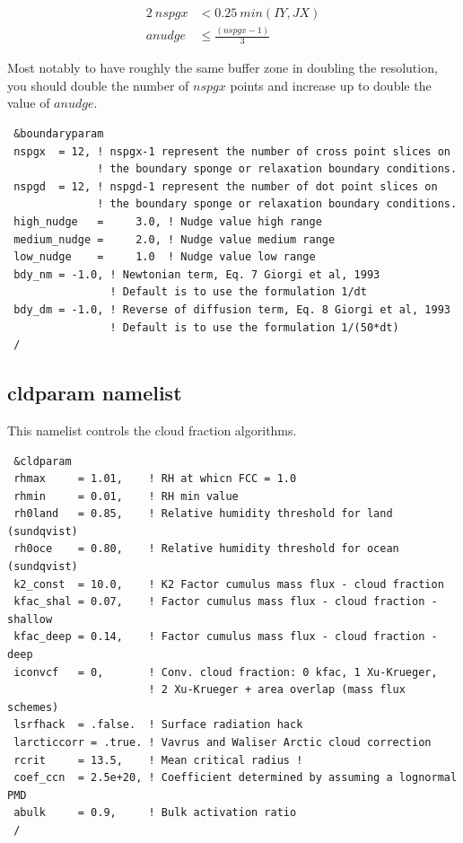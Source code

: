 \begin{align}
	2\ nspgx &< 0.25\ min(IY,JX) \\
	anudge &\le \frac{(nspgx-1)}{3}
\end{align}

Most notably to have roughly the same buffer zone in doubling the resolution,
you should double the number of $nspgx$ points and increase up to double the
value of $anudge$.

{\footnotesize
\begin{Verbatim}
 &boundaryparam
 nspgx  = 12, ! nspgx-1 represent the number of cross point slices on
              ! the boundary sponge or relaxation boundary conditions.
 nspgd  = 12, ! nspgd-1 represent the number of dot point slices on
              ! the boundary sponge or relaxation boundary conditions.
 high_nudge   =     3.0, ! Nudge value high range
 medium_nudge =     2.0, ! Nudge value medium range
 low_nudge    =     1.0  ! Nudge value low range
 bdy_nm = -1.0, ! Newtonian term, Eq. 7 Giorgi et al, 1993
                ! Default is to use the formulation 1/dt
 bdy_dm = -1.0, ! Reverse of diffusion term, Eq. 8 Giorgi et al, 1993 
                ! Default is to use the formulation 1/(50*dt)
 /
\end{Verbatim}
}


\subsection{cldparam namelist}

This namelist controls the cloud fraction algorithms.

{\footnotesize
\begin{Verbatim}
 &cldparam
 rhmax     = 1.01,    ! RH at whicn FCC = 1.0
 rhmin     = 0.01,    ! RH min value
 rh0land   = 0.85,    ! Relative humidity threshold for land (sundqvist)
 rh0oce    = 0.80,    ! Relative humidity threshold for ocean (sundqvist)
 k2_const  = 10.0,    ! K2 Factor cumulus mass flux - cloud fraction
 kfac_shal = 0.07,    ! Factor cumulus mass flux - cloud fraction - shallow
 kfac_deep = 0.14,    ! Factor cumulus mass flux - cloud fraction - deep
 iconvcf   = 0,       ! Conv. cloud fraction: 0 kfac, 1 Xu-Krueger,
                      ! 2 Xu-Krueger + area overlap (mass flux schemes)
 lsrfhack  = .false.  ! Surface radiation hack
 larcticcorr = .true. ! Vavrus and Waliser Arctic cloud correction
 rcrit     = 13.5,    ! Mean critical radius ! 
 coef_ccn  = 2.5e+20, ! Coefficient determined by assuming a lognormal PMD
 abulk     = 0.9,     ! Bulk activation ratio
 /
\end{Verbatim}
}

